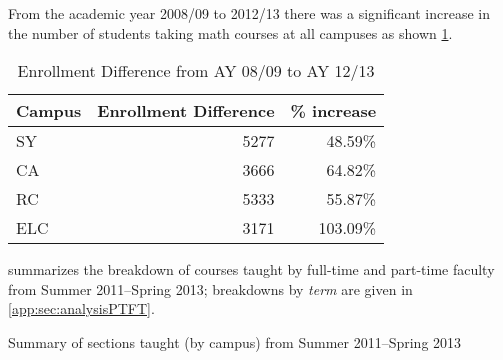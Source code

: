 From the academic year 2008/09 to 2012/13 there was a significant increase in the
number of students taking math courses at all campuses as shown
\cref{reflect:tab:enrollment}. 
\begin{table}[!htb]
  	\centering
		\caption{Enrollment Difference from AY 08/09 to AY 12/13}
        \label{reflect:tab:enrollment}
		\begin{tabular}{lrr}
          \toprule
			Campus & Enrollment Difference & \% increase \\
            \midrule
			SY     & 5277                  & 48.59\%     \\
			CA     & 3666                  & 64.82\%     \\
			RC     & 5333                  & 55.87\%     \\
			ELC    & 3171                  & 103.09\%    \\
            \bottomrule
		\end{tabular}
\end{table}

 summarizes the breakdown of courses taught by
full-time and part-time faculty from Summer 2011--Spring 2013; breakdowns 
by \emph{term} are given in \vref{app:sec:analysisPTFT}.

\begin{table}[!htb]
	\centering
	\caption{Summary of sections taught (by campus) from Summer 2011--Spring 2013}
	\label{app:tab:analysisPTFT}
	\sectionsTaughtSummary
	\pgfplotstabletypeset[sectionFTPT]{\sectionsTaughtSummary}
\end{table}


